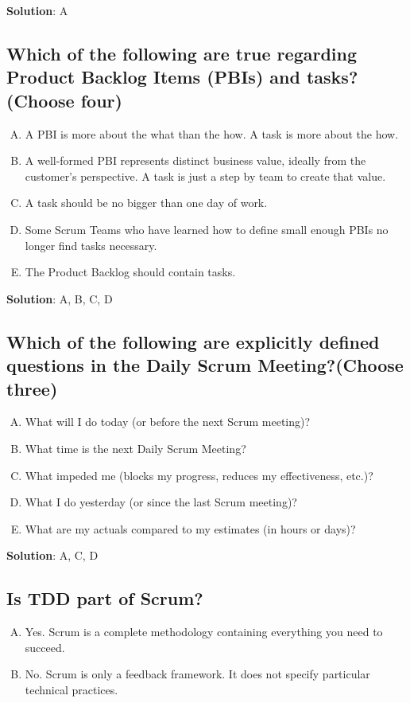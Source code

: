 \textbf{Solution}: A


\subsection{Which of the following are true regarding Product Backlog Items (PBIs) and tasks? (Choose four)}
\begin{enumerate}[A)]
  \item A PBI is more about the what than the how. A task is more about the how.
  \item A well-formed PBI represents distinct business value, ideally from the customer's perspective. A task is just a step by team to create that value.
  \item A task should be no bigger than one day of work.
  \item Some Scrum Teams who have learned how to define small enough PBIs no longer find tasks necessary.
  \item The Product Backlog should contain tasks.
\end{enumerate}


\textbf{Solution}: A, B, C, D


\subsection{Which of the following are explicitly defined questions in the Daily Scrum Meeting?(Choose three)}
\begin{enumerate}[A)]
  \item What will I do today (or before the next Scrum meeting)?
  \item What time is the next Daily Scrum Meeting?
  \item What impeded me (blocks my progress, reduces my effectiveness, etc.)?
  \item What I do yesterday (or since the last Scrum meeting)?
  \item What are my actuals compared to my estimates (in hours or days)?
\end{enumerate}


\textbf{Solution}: A, C, D


\subsection{Is TDD part of Scrum?}
\begin{enumerate}[A)]
  \item Yes. Scrum is a complete methodology containing everything you need to succeed.
  \item No. Scrum is only a feedback framework. It does not specify particular technical practices.
\end{enumerate}


